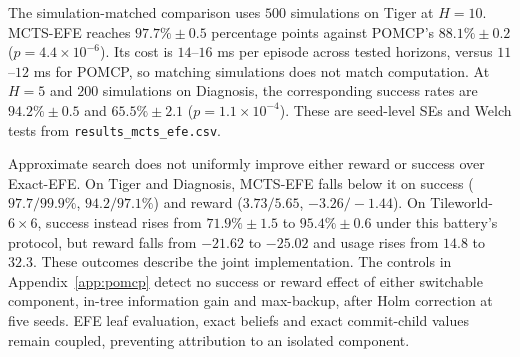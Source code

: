 \documentclass[runningheads]{llncs}
\begin{document}
The simulation-matched comparison uses $500$ simulations on Tiger at $H=10$. MCTS-EFE reaches $97.7\%\pm0.5$ percentage points against POMCP's $88.1\%\pm0.2$ ($p=4.4\times10^{-6}$). Its cost is $14$--$16$ ms per episode across tested horizons, versus $11$--$12$ ms for POMCP, so matching simulations does not match computation. At $H=5$ and $200$ simulations on Diagnosis, the corresponding success rates are $94.2\%\pm0.5$ and $65.5\%\pm2.1$ ($p=1.1\times10^{-4}$). These are seed-level SEs and Welch tests from \texttt{results\_\allowbreak mcts\_\allowbreak efe.csv}.

Approximate search does not uniformly improve either reward or success over Exact-EFE. On Tiger and Diagnosis, MCTS-EFE falls below it on success ($97.7/99.9\%$, $94.2/97.1\%$) and reward ($3.73/5.65$, $-3.26/-1.44$). On Tileworld-$6\times6$, success instead rises from $71.9\%\pm1.5$ to $95.4\%\pm0.6$ under this battery's protocol, but reward falls from $-21.62$ to $-25.02$ and usage rises from $14.8$ to $32.3$. These outcomes describe the joint implementation. The controls in Appendix~\ref{app:pomcp} detect no success or reward effect of either switchable component, in-tree information gain and max-backup, after Holm correction at five seeds. EFE leaf evaluation, exact beliefs and exact commit-child values remain coupled, preventing attribution to an isolated component.
\end{document}
